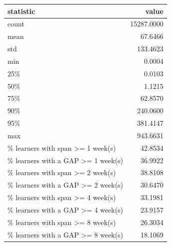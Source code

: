 \begin{tabular}{lr}
\toprule
statistic & value \\
\midrule
count & 15287.0000 \\
mean & 67.6466 \\
std & 133.4623 \\
min & 0.0004 \\
25\% & 0.0103 \\
50\% & 1.1215 \\
75\% & 62.8570 \\
90\% & 240.0600 \\
95\% & 381.4147 \\
max & 943.6631 \\
\% learners with span >= 1 week(s) & 42.8534 \\
\% learners with a GAP >= 1 week(s) & 36.9922 \\
\% learners with span >= 2 week(s) & 38.8108 \\
\% learners with a GAP >= 2 week(s) & 30.6470 \\
\% learners with span >= 4 week(s) & 33.1981 \\
\% learners with a GAP >= 4 week(s) & 23.9157 \\
\% learners with span >= 8 week(s) & 26.3034 \\
\% learners with a GAP >= 8 week(s) & 18.1069 \\
\bottomrule
\end{tabular}
